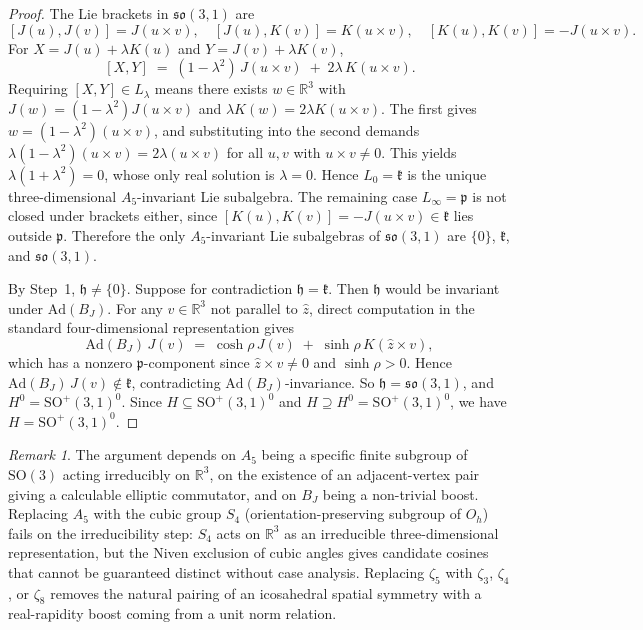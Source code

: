 \documentclass[11pt]{article}
\theoremstyle{remark}
\newtheorem*{remark}{Remark}
\begin{document}
\begin{proof}
The Lie brackets in $\mathfrak{so}(3,1)$ are
\[
  [J(u), J(v)] = J(u\times v), \quad
  [J(u), K(v)] = K(u\times v), \quad
  [K(u), K(v)] = -J(u\times v).
\]
For $X = J(u) + \lambda K(u)$ and $Y = J(v) + \lambda K(v)$,
\[
  [X, Y] \;=\; (1 - \lambda^2)\, J(u\times v) \;+\; 2\lambda\,
  K(u\times v).
\]
Requiring $[X, Y] \in L_\lambda$ means there exists $w \in
\mathbb{R}^3$ with $J(w) = (1-\lambda^2) J(u\times v)$ and $\lambda
K(w) = 2\lambda K(u\times v)$. The first gives $w = (1-\lambda^2)
(u \times v)$, and substituting into the second demands $\lambda(1 -
\lambda^2)(u\times v) = 2\lambda (u\times v)$ for all $u, v$ with
$u\times v \neq 0$. This yields $\lambda(1+\lambda^2) = 0$, whose
only real solution is $\lambda = 0$. Hence $L_0 = \mathfrak{k}$ is
the unique three-dimensional $A_5$-invariant Lie subalgebra. The
remaining case $L_\infty = \mathfrak{p}$ is not closed under brackets
either, since $[K(u), K(v)] = -J(u\times v) \in \mathfrak{k}$ lies
outside $\mathfrak{p}$. Therefore the only $A_5$-invariant Lie
subalgebras of $\mathfrak{so}(3,1)$ are $\{0\}$, $\mathfrak{k}$, and
$\mathfrak{so}(3,1)$.

By Step~1, $\mathfrak{h} \neq \{0\}$. Suppose for contradiction
$\mathfrak{h} = \mathfrak{k}$. Then $\mathfrak{h}$ would be invariant
under $\mathrm{Ad}(B_J)$. For any $v \in \mathbb{R}^3$ not parallel
to $\hat{z}$, direct computation in the standard four-dimensional
representation gives
\[
  \mathrm{Ad}(B_J)\, J(v) \;=\; \cosh\rho\, J(v) \;+\; \sinh\rho\,
  K(\hat{z} \times v),
\]
which has a nonzero $\mathfrak{p}$-component since $\hat{z} \times v
\neq 0$ and $\sinh\rho > 0$. Hence $\mathrm{Ad}(B_J)\, J(v) \notin
\mathfrak{k}$, contradicting $\mathrm{Ad}(B_J)$-invariance. So
$\mathfrak{h} = \mathfrak{so}(3,1)$, and $H^0 = \mathrm{SO}^+(3,1)^0$. Since $H \subseteq
\mathrm{SO}^+(3,1)^0$ and $H \supseteq H^0 = \mathrm{SO}^+(3,1)^0$, we
have $H = \mathrm{SO}^+(3,1)^0$.
\end{proof}

\begin{remark}
The argument depends on $A_5$ being a specific finite subgroup of
$\mathrm{SO}(3)$ acting irreducibly on $\mathbb{R}^3$, on the
existence of an adjacent-vertex pair giving a calculable elliptic
commutator, and on $B_J$ being a non-trivial boost. Replacing $A_5$
with the cubic group $S_4$ (orientation-preserving subgroup of $O_h$)
fails on the irreducibility step: $S_4$ acts on $\mathbb{R}^3$ as an
irreducible three-dimensional representation, but the Niven exclusion
of cubic angles gives candidate cosines that cannot be guaranteed
distinct without case analysis. Replacing $\zeta_5$ with $\zeta_3$,
$\zeta_4$, or $\zeta_8$ removes the natural pairing of an icosahedral
spatial symmetry with a real-rapidity boost coming from a unit norm
relation.
\end{remark}
\end{document}
